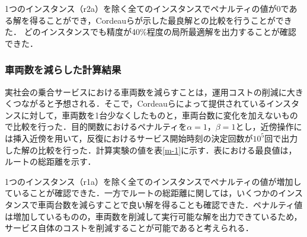 \documentclass[a4j,11pt,twocolumn]{jsarticle}
\begin{document}
1つのインスタンス（r2a）を除く全てのインスタンスでペナルティの値が0である解を得ることができ，Cordeauらが示した最良解との比較を行うことができた．
どのインスタンスでも精度が40\%程度の局所最適解を出力することが確認できた．

\subsubsection{車両数を減らした計算結果}
実社会の乗合サービスにおける車両数を減らすことは，運用コストの削減に大きくつながると予想される．そこで，Cordeauらによって提供されているインスタンスに対して，車両数を1台少なくしたものと，車両台数に変化を加えないもので比較を行った．目的関数におけるペナルティを$\alpha=1，\beta=1$とし，近傍操作には挿入近傍を用いて，反復におけるサービス開始時刻の決定回数が$10^5$回で出力した解の比較を行った．計算実験の値を表\ref{m-1}に示す．表における最良値は，ルートの総距離を示す．

1つのインスタンス（r1a）を除く全てのインスタンスでペナルティの値が増加していることが確認できた．一方でルートの総距離に関しては，いくつかのインスタンスで車両台数を減らすことで良い解を得ることも確認できた．ペナルティ値は増加しているものの，車両数を削減して実行可能な解を出力できているため，サービス自体のコストを削減することが可能であると考えられる．
\end{document}
